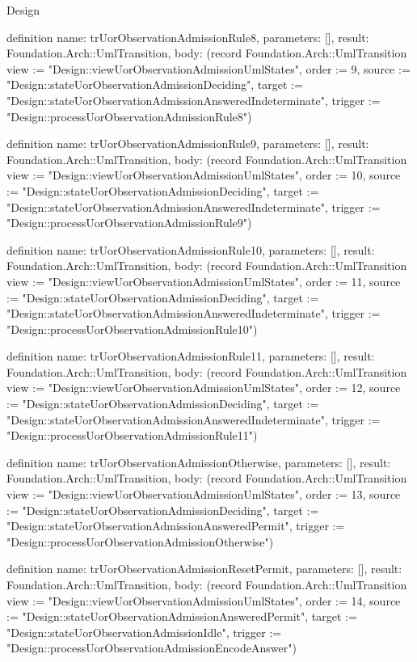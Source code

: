 \begin{lexlean}{Design}
\begin{semanticmodule}
definition{
  name: trUorObservationAdmissionRule8,
  parameters: [],
  result: Foundation.Arch::UmlTransition,
  body: (record Foundation.Arch::UmlTransition {view := "Design::viewUorObservationAdmissionUmlStates", order := 9, source := "Design::stateUorObservationAdmissionDeciding", target := "Design::stateUorObservationAdmissionAnsweredIndeterminate", trigger := "Design::processUorObservationAdmissionRule8"})
}

definition{
  name: trUorObservationAdmissionRule9,
  parameters: [],
  result: Foundation.Arch::UmlTransition,
  body: (record Foundation.Arch::UmlTransition {view := "Design::viewUorObservationAdmissionUmlStates", order := 10, source := "Design::stateUorObservationAdmissionDeciding", target := "Design::stateUorObservationAdmissionAnsweredIndeterminate", trigger := "Design::processUorObservationAdmissionRule9"})
}

definition{
  name: trUorObservationAdmissionRule10,
  parameters: [],
  result: Foundation.Arch::UmlTransition,
  body: (record Foundation.Arch::UmlTransition {view := "Design::viewUorObservationAdmissionUmlStates", order := 11, source := "Design::stateUorObservationAdmissionDeciding", target := "Design::stateUorObservationAdmissionAnsweredIndeterminate", trigger := "Design::processUorObservationAdmissionRule10"})
}

definition{
  name: trUorObservationAdmissionRule11,
  parameters: [],
  result: Foundation.Arch::UmlTransition,
  body: (record Foundation.Arch::UmlTransition {view := "Design::viewUorObservationAdmissionUmlStates", order := 12, source := "Design::stateUorObservationAdmissionDeciding", target := "Design::stateUorObservationAdmissionAnsweredIndeterminate", trigger := "Design::processUorObservationAdmissionRule11"})
}

definition{
  name: trUorObservationAdmissionOtherwise,
  parameters: [],
  result: Foundation.Arch::UmlTransition,
  body: (record Foundation.Arch::UmlTransition {view := "Design::viewUorObservationAdmissionUmlStates", order := 13, source := "Design::stateUorObservationAdmissionDeciding", target := "Design::stateUorObservationAdmissionAnsweredPermit", trigger := "Design::processUorObservationAdmissionOtherwise"})
}

definition{
  name: trUorObservationAdmissionResetPermit,
  parameters: [],
  result: Foundation.Arch::UmlTransition,
  body: (record Foundation.Arch::UmlTransition {view := "Design::viewUorObservationAdmissionUmlStates", order := 14, source := "Design::stateUorObservationAdmissionAnsweredPermit", target := "Design::stateUorObservationAdmissionIdle", trigger := "Design::processUorObservationAdmissionEncodeAnswer"})
}


\end{semanticmodule}
\end{lexlean}
